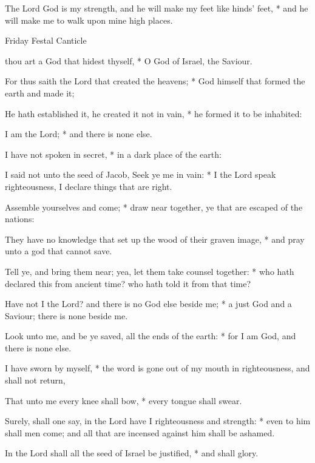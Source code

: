 \begin{multicols}{2}
The Lord God is my strength, and he will make my feet like hinds' feet, * and he will make me to walk upon mine high places.
\begin{inhead}
Friday Festal Canticle
\end{inhead}
 thou art a God that hidest thyself, * O God of Israel, the Saviour.\par
{}
For thus saith the Lord that created the heavens; * God himself that formed the earth and made it;\par
He hath established it, he created it not in vain, * he formed it to be inhabited:\par
I am the Lord; * and there is none else.\par
I have not spoken in secret, * in a dark place of the earth:\par
I said not unto the seed of Jacob, Seek ye me in vain: * I the Lord speak righteousness, I declare things that are right.\par
Assemble yourselves and come; * draw near together, ye that are escaped of the nations:\par
They have no knowledge that set up the wood of their graven image, * and pray unto a god that cannot save.\par
Tell ye, and bring them near; {\dag} yea, let them take counsel together: * who hath declared this from ancient time? who hath told it from that time?\par
Have not I the Lord? and there is no God else beside me; * a just God and a Saviour; there is none beside me.\par
Look unto me, and be ye saved, all the ends of the earth: * for I am God, and there is none else.\par
I have sworn by myself, * the word is gone out of my mouth in righteousness, and shall not return,\par
That unto me every knee shall bow, * every tongue shall swear.\par
Surely, shall one say, in the Lord have I righteousness and strength: * even to him shall men come; and all that are incensed against him shall be ashamed.\par
In the Lord shall all the seed of Israel be justified, * and shall glory.

\end{multicols}
